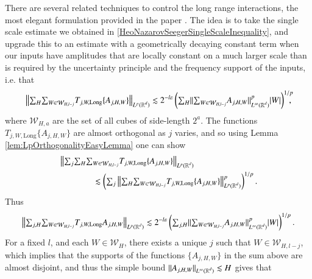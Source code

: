 There are several related techniques to control the long range interactions, the most elegant formulation provided in the paper \cite{HeoandNazarovandSeeger2}. The idea is to take the single scale estimate we obtained in \ref{HeoNazarovSeegerSingleScaleInequality}, and upgrade this to an estimate with a geometrically decaying constant term when our inputs have amplitudes that are locally constant on a much larger scale than is required by the uncertainty principle and the frequency support of the inputs, i.e. that
%
\begin{equation}
  \left\| {\textstyle \sum\nolimits_H} {\textstyle \sum\nolimits_{W \in \mathcal{W}_{H,l-j}}} T_{j,W,\text{Long}} \{ A_{j,H,W} \} \right\|_{L^p(\operatorname{\mathbb{R}}^d)} \lesssim 2^{-l \varepsilon} \left( {\textstyle \sum\nolimits_H} \| {\textstyle \sum\nolimits_{W \in \mathcal{W}_{H,l-j}}} A_{j,H,W} \|_{L^\infty(\operatorname{\mathbb{R}}^d)}^p |W| \right)^{1/p}\!\!\!\!,
\end{equation}
%
where $\mathcal{W}_{H,a}$ are the set of all cubes of side-length $2^a$. The functions $T_{j,W,\text{Long}} \{ A_{j,H,W} \}$ are almost orthogonal as $j$ varies, and so using Lemma \ref{lem:LpOrthogonalityEasyLemma} one can show
\begin{equation}
\begin{split}
  &\left\| {\textstyle \sum\nolimits_j} {\textstyle \sum\nolimits_H} {\textstyle \sum\nolimits_{W \in \mathcal{W}_{H,l-j}}} T_{j,W,\text{Long}} \{ A_{j,H,W} \} \right\|_{L^p(\operatorname{\mathbb{R}}^d)}\\
  &\quad\quad\quad\quad \lesssim \left( {\textstyle \sum\nolimits_j} \left\| {\textstyle \sum\nolimits_H} {\textstyle \sum\nolimits_{W \in \mathcal{W}_{H,l-j}}} T_{j,W,\text{Long}} \{ A_{j,H,W} \} \right\|_{L^p(\operatorname{\mathbb{R}}^d)}^p \right)^{1/p}.
\end{split}
\end{equation}
%
Thus
%
\begin{equation}
  \left\| {\textstyle \sum\nolimits_{j,H}} {\textstyle \sum\nolimits_{W \in \mathcal{W}_{H,l-j}}} T_{j,W,\text{Long}} A_{j,H,W} \right\|_{L^p(\operatorname{\mathbb{R}}^d)} \lesssim 2^{-l \varepsilon} \left( {\textstyle \sum\nolimits_{j,H}} \|  {\textstyle \sum\nolimits_{W \in \mathcal{W}_{H,l-j}}} A_{j,H,W} \|_{L^\infty(\operatorname{\mathbb{R}}^d)}^p |W| \right)^{1/p}.
\end{equation}
%
For a fixed $l$, and each $W \in \mathcal{W}_H$, there exists a unique $j$ such that $W \in \mathcal{W}_{H,l-j}$, which implies that the supports of the functions $\{ A_{j,H,W} \}$ in the sum above are almost disjoint, and thus the simple bound $\| A_{j,H,W} \|_{L^\infty(\operatorname{\mathbb{R}}^d)} \lesssim H$ gives that
